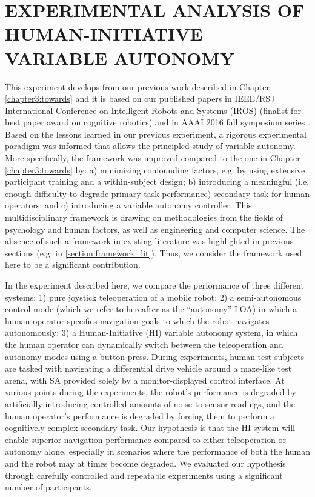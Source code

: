 \documentclass[a4paper,12pt,oneside,openright]{bhamthesis}
\begin{document}
\chapter{EXPERIMENTAL ANALYSIS OF HUMAN-INITIATIVE VARIABLE AUTONOMY}\label{chapter4:HI}
This experiment develops from our previous work described in Chapter \ref{chapter3:towards} and it is based on our published papers in IEEE/RSJ International Conference on Intelligent Robots and Systems (IROS) \citep{Chiou2016} (finalist for best paper award on cognitive robotics) and in AAAI 2016 fall symposium series \citep{Chiou2016_AAAI}. Based on the lessons learned in our previous experiment, a rigorous experimental paradigm was informed that allows the principled study of variable autonomy. More specifically, the framework was improved compared to the one in Chapter \ref{chapter3:towards} by: a) minimizing confounding factors, e.g. by using extensive participant training and a within-subject design; b) introducing a meaningful (i.e. enough difficulty to degrade primary task performance) secondary task for human operators; and c) introducing a variable autonomy controller.  This multidisciplinary framework is drawing on methodologies from the fields of psychology and human factors, as well as engineering and computer science. The absence of such a framework in existing literature was highlighted in previous sections (e.g. in \ref{section:framework_lit}). Thus, we consider the framework used here to be a significant contribution.

In the experiment described here, we compare the performance of three different systems: 1) pure joystick teleoperation of a mobile robot; 2) a semi-autonomous control mode (which we refer to hereafter as the ``autonomy'' LOA) in which a human operator specifies navigation goals to which the robot navigates autonomously; 3) a Human-Initiative (HI) variable autonomy system, in which the human operator can dynamically switch between the teleoperation and autonomy modes using a button press. During experiments, human test subjects are tasked with navigating a differential drive vehicle around a maze-like test arena, with SA provided solely by a monitor-displayed control interface. At various points during the experiments, the robot's performance is degraded by artificially introducing controlled amounts of noise to sensor readings, and the human operator's performance is degraded by forcing them to perform a cognitively complex secondary task.  Our hypothesis is that the HI system will enable superior navigation performance compared to either teleoperation or autonomy alone, especially in scenarios where the performance of both the human and the robot may at times become degraded. We evaluated our hypothesis through carefully controlled and repeatable experiments using a significant number of participants.
\end{document}
